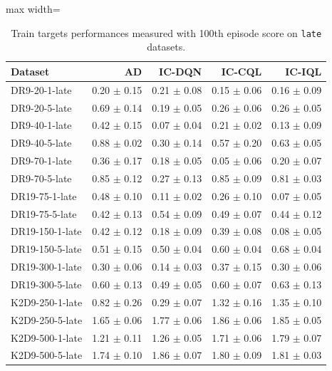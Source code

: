 \documentclass{article}
\begin{document}
\begin{table}[ht]
    \label{tab:}
    \begin{center}
    \caption{Train targets performances measured with 100th episode score on \texttt{late} datasets.}
    \begin{small}
    \begin{adjustbox}{max width=\columnwidth}
		\begin{tabular}{l|rrrr}
		\toprule
	\textbf{Dataset} & \textbf{AD} & \textbf{IC-DQN} & \textbf{IC-CQL} & \textbf{IC-IQL}\\
\midrule
DR9-20-1-late & 0.20 $\pm$ 0.15 & 0.21 $\pm$ 0.08 & 0.15 $\pm$ 0.06 & 0.16 $\pm$ 0.09\\
DR9-20-5-late & 0.69 $\pm$ 0.14 & 0.19 $\pm$ 0.05 & 0.26 $\pm$ 0.06 & 0.26 $\pm$ 0.05\\
DR9-40-1-late & 0.42 $\pm$ 0.15 & 0.07 $\pm$ 0.04 & 0.21 $\pm$ 0.02 & 0.13 $\pm$ 0.09\\
DR9-40-5-late & 0.88 $\pm$ 0.02 & 0.30 $\pm$ 0.14 & 0.57 $\pm$ 0.20 & 0.63 $\pm$ 0.05\\
DR9-70-1-late & 0.36 $\pm$ 0.17 & 0.18 $\pm$ 0.05 & 0.05 $\pm$ 0.06 & 0.20 $\pm$ 0.07\\
DR9-70-5-late & 0.85 $\pm$ 0.12 & 0.27 $\pm$ 0.13 & 0.85 $\pm$ 0.09 & 0.81 $\pm$ 0.03\\
DR19-75-1-late & 0.48 $\pm$ 0.10 & 0.11 $\pm$ 0.02 & 0.26 $\pm$ 0.10 & 0.07 $\pm$ 0.05\\
DR19-75-5-late & 0.42 $\pm$ 0.13 & 0.54 $\pm$ 0.09 & 0.49 $\pm$ 0.07 & 0.44 $\pm$ 0.12\\
DR19-150-1-late & 0.42 $\pm$ 0.12 & 0.18 $\pm$ 0.09 & 0.39 $\pm$ 0.08 & 0.08 $\pm$ 0.05\\
DR19-150-5-late & 0.51 $\pm$ 0.15 & 0.50 $\pm$ 0.04 & 0.60 $\pm$ 0.04 & 0.68 $\pm$ 0.04\\
DR19-300-1-late & 0.30 $\pm$ 0.06 & 0.14 $\pm$ 0.03 & 0.37 $\pm$ 0.15 & 0.30 $\pm$ 0.06\\
DR19-300-5-late & 0.60 $\pm$ 0.13 & 0.49 $\pm$ 0.05 & 0.60 $\pm$ 0.07 & 0.63 $\pm$ 0.13\\
K2D9-250-1-late & 0.82 $\pm$ 0.26 & 0.29 $\pm$ 0.07 & 1.32 $\pm$ 0.16 & 1.35 $\pm$ 0.10\\
K2D9-250-5-late & 1.65 $\pm$ 0.06 & 1.77 $\pm$ 0.06 & 1.86 $\pm$ 0.06 & 1.85 $\pm$ 0.05\\
K2D9-500-1-late & 1.21 $\pm$ 0.11 & 1.26 $\pm$ 0.05 & 1.71 $\pm$ 0.06 & 1.79 $\pm$ 0.07\\
K2D9-500-5-late & 1.74 $\pm$ 0.10 & 1.86 $\pm$ 0.07 & 1.80 $\pm$ 0.09 & 1.81 $\pm$ 0.03\\

\end{tabular}
\end{adjustbox}
\end{small}
\end{center}
\end{table}
\end{document}
